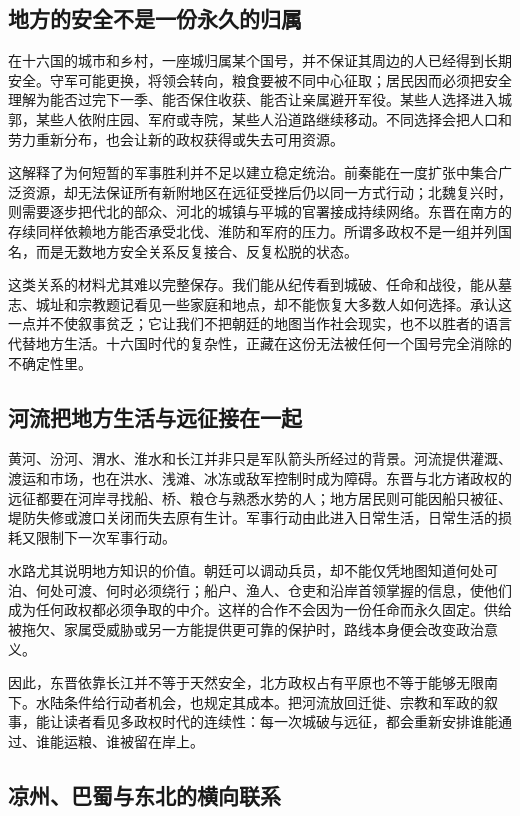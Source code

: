 \subsection{地方的安全不是一份永久的归属}

在十六国的城市和乡村，一座城归属某个国号，并不保证其周边的人已经得到长期安全。守军可能更换，将领会转向，粮食要被不同中心征取；居民因而必须把安全理解为能否过完下一季、能否保住收获、能否让亲属避开军役。某些人选择进入城郭，某些人依附庄园、军府或寺院，某些人沿道路继续移动。不同选择会把人口和劳力重新分布，也会让新的政权获得或失去可用资源。

这解释了为何短暂的军事胜利并不足以建立稳定统治。前秦能在一度扩张中集合广泛资源，却无法保证所有新附地区在远征受挫后仍以同一方式行动；北魏复兴时，则需要逐步把代北的部众、河北的城镇与平城的官署接成持续网络。东晋在南方的存续同样依赖地方能否承受北伐、淮防和军府的压力。所谓多政权不是一组并列国名，而是无数地方安全关系反复接合、反复松脱的状态。

这类关系的材料尤其难以完整保存。我们能从纪传看到城破、任命和战役，能从墓志、城址和宗教题记看见一些家庭和地点，却不能恢复大多数人如何选择。承认这一点并不使叙事贫乏；它让我们不把朝廷的地图当作社会现实，也不以胜者的语言代替地方生活。十六国时代的复杂性，正藏在这份无法被任何一个国号完全消除的不确定性里。

\subsection{河流把地方生活与远征接在一起}

黄河、汾河、渭水、淮水和长江并非只是军队箭头所经过的背景。河流提供灌溉、渡运和市场，也在洪水、浅滩、冰冻或敌军控制时成为障碍。东晋与北方诸政权的远征都要在河岸寻找船、桥、粮仓与熟悉水势的人；地方居民则可能因船只被征、堤防失修或渡口关闭而失去原有生计。军事行动由此进入日常生活，日常生活的损耗又限制下一次军事行动。

水路尤其说明地方知识的价值。朝廷可以调动兵员，却不能仅凭地图知道何处可泊、何处可渡、何时必须绕行；船户、渔人、仓吏和沿岸首领掌握的信息，使他们成为任何政权都必须争取的中介。这样的合作不会因为一份任命而永久固定。供给被拖欠、家属受威胁或另一方能提供更可靠的保护时，路线本身便会改变政治意义。

因此，东晋依靠长江并不等于天然安全，北方政权占有平原也不等于能够无限南下。水陆条件给行动者机会，也规定其成本。把河流放回迁徙、宗教和军政的叙事，能让读者看见多政权时代的连续性：每一次城破与远征，都会重新安排谁能通过、谁能运粮、谁被留在岸上。

\subsection{凉州、巴蜀与东北的横向联系}

